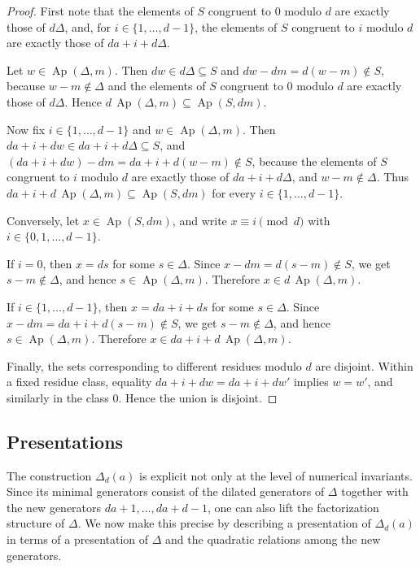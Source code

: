 \documentclass[12pt,a4paper]{amsart}
\theoremstyle{definition}
\theoremstyle{remark}
\begin{document}
\begin{proof}
First note that the elements of $S$ congruent to $0$ modulo $d$ are exactly those of $d\Delta$, and, for
$i\in\{1,\dots,d-1\}$, the elements of $S$ congruent to $i$ modulo $d$ are exactly those of $da+i+d\Delta$.

Let $w\in\operatorname{Ap}(\Delta,m)$. Then $dw\in d\Delta\subseteq S$ and
$dw-dm=d(w-m)\notin S$, because $w-m\notin \Delta$ and the elements of $S$ congruent to $0$ modulo $d$ are exactly those of $d\Delta$. Hence $d\,\operatorname{Ap}(\Delta,m)\subseteq\operatorname{Ap}(S,dm)$.

Now fix $i\in\{1,\dots,d-1\}$ and $w\in\operatorname{Ap}(\Delta,m)$. Then $da+i+dw\in da+i+d\Delta\subseteq S$, and $
(da+i+dw)-dm=da+i+d(w-m)\notin S$, 
because the elements of $S$ congruent to $i$ modulo $d$ are exactly those of $da+i+d\Delta$, and
$w-m\notin \Delta$. Thus $
da+i+d\,\operatorname{Ap}(\Delta,m)\subseteq\operatorname{Ap}(S,dm)
$
for every $i\in\{1,\dots,d-1\}$.

Conversely, let $x\in\operatorname{Ap}(S,dm)$, and write $x\equiv i\pmod d$ with
$i\in\{0,1,\dots,d-1\}$.

If $i=0$, then $x=ds$ for some $s\in \Delta$. Since
$
x-dm=d(s-m)\notin S$,
we get $s-m\notin \Delta$, and hence $s\in\operatorname{Ap}(\Delta,m)$. Therefore
$
x\in d\,\operatorname{Ap}(\Delta,m)$.

If $i\in\{1,\dots,d-1\}$, then $x=da+i+ds$ for some $s\in \Delta$. Since $x-dm=da+i+d(s-m)\notin S$, we get $s-m\notin \Delta$, and hence $s\in\operatorname{Ap}(\Delta,m)$. Therefore
$x\in da+i+d\,\operatorname{Ap}(\Delta,m)$.

Finally, the sets corresponding to different residues modulo $d$ are disjoint. Within a fixed residue class, equality
$da+i+dw=da+i+dw'$ implies $w=w'$, and similarly in the class $0$. Hence the union is disjoint.
\end{proof}

\subsection{Presentations}

The construction $\Delta_d(a)$ is explicit not only at the level of numerical invariants. Since
its minimal generators consist of the dilated generators of $\Delta$ together with the new
generators $da+1,\dots,da+d-1$, one can also lift the factorization structure of $\Delta$.
We now make this precise by describing a presentation of $\Delta_d(a)$ in terms of a
presentation of $\Delta$ and the quadratic relations among the new generators.
\end{document}
